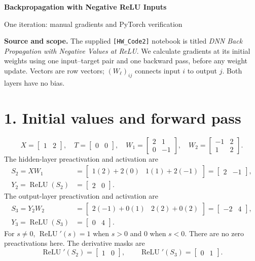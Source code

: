 \documentclass[11pt]{article}
\newcommand{\relu}{\operatorname{ReLU}}
\begin{document}
\begin{center}
{\Large\bfseries Backpropagation with Negative ReLU Inputs}\par
{\large One iteration: manual gradients and PyTorch verification}
\end{center}

\textbf{Source and scope.} The supplied \texttt{[HW\_Code2]} notebook is titled
\emph{DNN Back Propagation with Negative Values at ReLU}.
We calculate gradients at its initial weights using one input--target pair
and one backward pass, before any weight update. Vectors are row vectors;
$(W_\ell)_{ij}$ connects input $i$ to output $j$. Both layers have no bias.

\section*{1. Initial values and forward pass}
\[
X=\begin{bmatrix}1&2\end{bmatrix},\quad
T=\begin{bmatrix}0&0\end{bmatrix},\quad
W_1=\begin{bmatrix}2&1\\0&-1\end{bmatrix},\quad
W_2=\begin{bmatrix}-1&2\\1&2\end{bmatrix}.
\]
The hidden-layer preactivation and activation are
\begin{align*}
S_2=XW_1
 &=\begin{bmatrix}1(2)+2(0)&1(1)+2(-1)\end{bmatrix}
 =\begin{bmatrix}2&-1\end{bmatrix},\\
Y_2=\relu(S_2)&=\begin{bmatrix}2&0\end{bmatrix}.
\end{align*}
The output-layer preactivation and activation are
\begin{align*}
S_3=Y_2W_2
 &=\begin{bmatrix}2(-1)+0(1)&2(2)+0(2)\end{bmatrix}
 =\begin{bmatrix}-2&4\end{bmatrix},\\
Y_3=\relu(S_3)&=\begin{bmatrix}0&4\end{bmatrix}.
\end{align*}
For $s\ne0$, $\relu'(s)=1$ when $s>0$ and $0$ when $s<0$.
There are no zero preactivations here. The derivative masks are
\[
\relu'(S_2)=\begin{bmatrix}1&0\end{bmatrix},\qquad
\relu'(S_3)=\begin{bmatrix}0&1\end{bmatrix}.
\]
\end{document}
